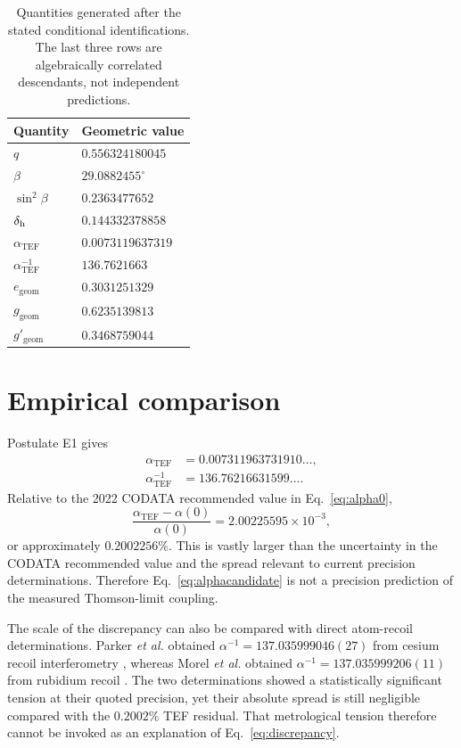 \documentclass[10pt,twocolumn]{article}
\newcommand{\TEF}{\mathrm{TEF}}
\newcommand{\geom}{\mathrm{geom}}
\begin{document}
\begin{table}[t]
\centering
\caption{Quantities generated after the stated conditional identifications.  The last three rows are
algebraically correlated descendants, not independent predictions.}
\label{tab:seed}
\begin{tabular}{@{}ll@{}}
\toprule
Quantity & Geometric value \\
\midrule
$q$ & $0.556324180045$ \\
$\beta$ & $29.0882455^\circ$ \\
$\sin^2\beta$ & $0.2363477652$ \\
$\delta_{\rm h}$ & $0.144332378858$ \\
$\alpha_{\TEF}$ & $0.0073119637319$ \\
$\alpha_{\TEF}^{-1}$ & $136.7621663$ \\
$e_{\geom}$ & $0.3031251329$ \\
$g_{\geom}$ & $0.6235139813$ \\
$g'_{\geom}$ & $0.3468759044$ \\
\bottomrule
\end{tabular}
\end{table}

\section{Empirical comparison}
\label{sec:comparison}

Postulate E1 gives
\begin{align}
\alpha_{\TEF}&=0.007311963731910\ldots,\\
\alpha_{\TEF}^{-1}&=136.76216631599\ldots.
\end{align}
Relative to the 2022 CODATA recommended value in Eq.~\eqref{eq:alpha0},
\begin{equation}
\frac{\alpha_{\TEF}-\alpha(0)}{\alpha(0)}
=2.00225595\times10^{-3},
\label{eq:discrepancy}
\end{equation}
or approximately $0.2002256\%$.  This is vastly larger than the uncertainty in the CODATA
recommended value and the spread relevant to current precision determinations.  Therefore
Eq.~\eqref{eq:alphacandidate} is not a precision prediction of the measured Thomson-limit coupling.

The scale of the discrepancy can also be compared with direct atom-recoil determinations.  Parker
\emph{et al.} obtained $\alpha^{-1}=137.035999046(27)$ from cesium recoil interferometry
\cite{Parker2018}, whereas Morel \emph{et al.} obtained
$\alpha^{-1}=137.035999206(11)$ from rubidium recoil \cite{Morel2020}.  The two determinations
showed a statistically significant tension at their quoted precision, yet their absolute spread is
still negligible compared with the $0.2002\%$ TEF residual.  That metrological tension therefore
cannot be invoked as an explanation of Eq.~\eqref{eq:discrepancy}.
\end{document}
